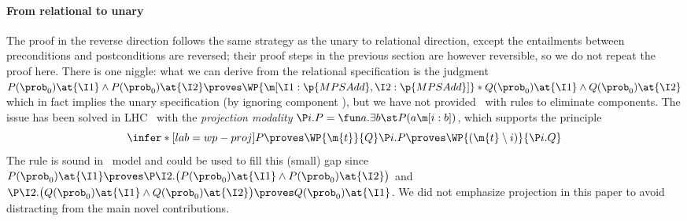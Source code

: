 \paragraph{From relational to unary}
The proof in the reverse direction follows the same strategy as the unary to relational direction, except the entailments between preconditions and postconditions are reversed; their proof steps in the previous section are however reversible, so we do not repeat the proof here.
There is one niggle:
what we can derive from the relational specification is the judgment
$
  P(\prob_0)\at{\I1} \land P(\prob_0)\at{\I2}
  \proves
  \WP {\m[\I1: \p{MPSAdd}, \I2: \p{MPSAdd}]}*{
    Q(\prob_0)\at{\I1} \land Q(\prob_0)\at{\I2}
  }
$
which in fact implies the unary specification (by ignoring component ),
but we have not provided \thelogic\ with rules to eliminate components.
The issue has been solved in LHC~\cite{d2022proving} with
the \emph{projection modality}
$ \P i. P = \fun a. \exists b\st P(a\m[i: b]) $,
which supports the principle
\[
  \infer*[lab=wp-proj]{
    P \proves \WP {\m{t}} {Q}
  }{
    \P i. P \proves \WP {(\m{t}\setminus i)} {\P i.Q}
  }
\]
The rule is sound in \thelogic\ model and could be used to fill this (small) gap
since
$
  P(\prob_0)\at{\I1}
  \proves
  \P\I2.\bigl(P(\prob_0)\at{\I1} \land P(\prob_0)\at{\I2}\bigr)
$ and
$
  \P\I2.\bigl(Q(\prob_0)\at{\I1} \land Q(\prob_0)\at{\I2}\bigr)
  \proves
  Q(\prob_0)\at{\I1}
$.
We did not emphasize projection in this paper to avoid distracting from the main novel contributions.
